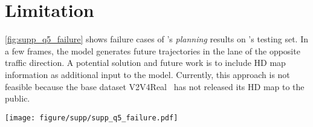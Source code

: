 \section{Limitation}
\cref{fig:supp_q5_failure} shows failure cases of \namemethod's \textit{planning} results on \namedataset's testing set. In a few frames, the model generates future trajectories in the lane of the opposite traffic direction. A potential solution and future work is to include HD map information as additional input to the model. Currently, this approach is not feasible because the base dataset V2V4Real~\cite{xu2023v2v4real} has not released its HD map to the public.


\begin{figure*}[!t]
\centering
\texttt{[image: figure/supp/supp\_q5\_failure.pdf]}
\caption[]
        {Failure cases of \namemethod's \textit{planning} results on \namedataset's testing set.
         \textcolor{Green}{Green curve}: future trajectories in ground-truth answers. \textcolor{Green}{Green $\circ$}: ending waypoints in ground-truth answers. \textcolor{olive}{Yellow curve} and \textcolor{cyan}{Cyan curve}: model planning outputs corresponding to \textcolor{olive}{CAV\_EGO} and \textcolor{cyan}{CAV\_1}, respectively. \textcolor{olive}{Yellow $\times$} and \textcolor{cyan}{Cyan $\times$}: ending waypoints in model outputs corresponding to \textcolor{olive}{CAV\_EGO} and \textcolor{cyan}{CAV\_1}, respectively.} 
        \label{fig:supp_q5_failure}
        \vspace{-5pt}
\end{figure*}









